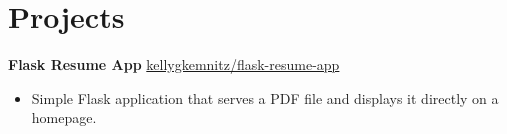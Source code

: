 \documentclass[11pt]{article}       %
\begin{document}
\section*{Projects}
\textbf{Flask Resume App} \hfill \href{https://github.com/kellygkemnitz/flask-resume-app}{kellygkemnitz/flask-resume-app} \\
\vspace{-9pt}
\begin{itemize}
 \item Simple Flask application that serves a PDF file and displays it directly on a homepage.
\end{itemize}
%
%

\end{document}
